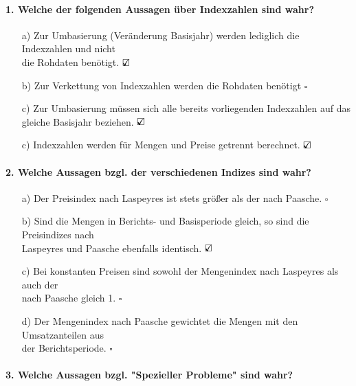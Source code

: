 \documentclass[a4paper]{article}
\begin{document}
\paragraph{1. Welche der folgenden Aussagen über Indexzahlen sind wahr?}

\begin{itemize}
    \item[a)] Zur Umbasierung (Veränderung Basisjahr) werden lediglich die Indexzahlen und nicht\\die Rohdaten benötigt. \hfill $\text{\rlap{$\checkmark$}}\square$
    \item[b)] Zur Verkettung von Indexzahlen werden die Rohdaten benötigt \hfill $\square$
    \item[c)] Zur Umbasierung müssen sich alle bereits vorliegenden Indexzahlen auf das\\gleiche Basisjahr beziehen. \hfill $\text{\rlap{$\checkmark$}}\square$
    \item[c)] Indexzahlen werden für Mengen und Preise getrennt berechnet. \hfill $\text{\rlap{$\checkmark$}}\square$
\end{itemize}

\paragraph{2. Welche Aussagen bzgl. der verschiedenen Indizes sind wahr?}

\begin{itemize}
    \item[a)] Der Preisindex nach Laspeyres ist stets größer als der nach Paasche. \hfill $\square$
    \item[b)] Sind die Mengen in Berichts- und Basisperiode gleich, so sind die Preisindizes nach\\Laspeyres und Paasche ebenfalls identisch. \hfill $\text{\rlap{$\checkmark$}}\square$
    \item[c)] Bei konstanten Preisen sind sowohl der Mengenindex nach Laspeyres als auch der\\nach Paasche gleich 1. \hfill $\square$
    \item[d)] Der Mengenindex nach Paasche gewichtet die Mengen mit den Umsatzanteilen aus\\der Berichtsperiode. \hfill $\square$
\end{itemize}

\paragraph{3. Welche Aussagen bzgl. "Spezieller Probleme" sind wahr?}
\end{document}
